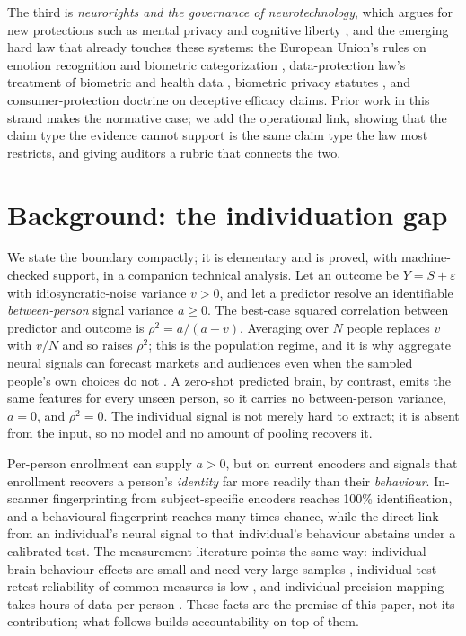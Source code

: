 \documentclass[sigconf,review,anonymous]{acmart}
\begin{document}
The third is \emph{neurorights and the governance of neurotechnology}, which argues for new protections such
as mental privacy and cognitive liberty \cite{ienca2017}, and the emerging hard law that already touches
these systems: the European Union's rules on emotion recognition and biometric categorization
\cite{euaiact2024}, data-protection law's treatment of biometric and health data \cite{gdpr2016}, biometric
privacy statutes \cite{bipa2008}, and consumer-protection doctrine on deceptive efficacy claims. Prior work
in this strand makes the normative case; we add the operational link, showing that the claim type the
evidence cannot support is the same claim type the law most restricts, and giving auditors a rubric that
connects the two.

\section{Background: the individuation gap}
We state the boundary compactly; it is elementary and is proved, with machine-checked support, in a companion
technical analysis. Let an outcome be $Y=S+\varepsilon$ with idiosyncratic-noise variance $v>0$, and let a
predictor resolve an identifiable \emph{between-person} signal variance $a\ge 0$. The best-case squared
correlation between predictor and outcome is $\rho^2 = a/(a+v)$. Averaging over $N$ people replaces $v$ with
$v/N$ and so raises $\rho^2$; this is the population regime, and it is why aggregate neural signals can
forecast markets and audiences even when the sampled people's own choices do not
\cite{knutson2007,dmochowski2014}. A zero-shot predicted brain, by contrast, emits the same features for every
unseen person, so it carries no between-person variance, $a=0$, and $\rho^2=0$. The individual signal is not
merely hard to extract; it is absent from the input, so no model and no amount of pooling recovers it.

Per-person enrollment can supply $a>0$, but on current encoders and signals that enrollment recovers a
person's \emph{identity} far more readily than their \emph{behaviour}. In-scanner fingerprinting from
subject-specific encoders reaches 100\% identification, and a behavioural fingerprint reaches many times
chance, while the direct link from an individual's neural signal to that individual's behaviour abstains under
a calibrated test. The measurement literature points the same way: individual brain-behaviour effects are
small and need very large samples \cite{marek2022,kang2024}, individual test-retest reliability of common
measures is low \cite{elliott2020}, and individual precision mapping takes hours of data per person
\cite{gordon2017}. These facts are the premise of this paper, not its contribution; what follows builds
accountability on top of them.
\end{document}

